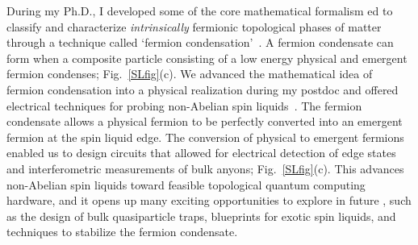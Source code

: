 During my Ph.D., I developed some of the core mathematical formalism ed to classify and characterize {\em intrinsically} fermionic topological phases of matter through a technique called `fermion condensation'~\cite{ALM}. A fermion condensate can form when a composite particle consisting of a low energy physical and emergent fermion condenses;  Fig.~\ref{SLfig}(c). We advanced the mathematical idea of fermion condensation into a physical realization during my postdoc and offered  electrical techniques for probing non-Abelian spin liquids~\cite{Aasen20}.
The fermion condensate allows a physical fermion to be perfectly converted into an emergent fermion at the spin liquid edge. The conversion of physical to emergent fermions enabled us to design circuits that allowed for electrical detection of edge states and interferometric measurements of bulk anyons;  Fig.~\ref{SLfig}(c). This  advances non-Abelian spin liquids toward feasible topological quantum computing hardware, and it opens up many exciting opportunities to explore in future , such as the design of bulk quasiparticle traps, blueprints for  exotic spin liquids, and techniques to stabilize the fermion condensate.



